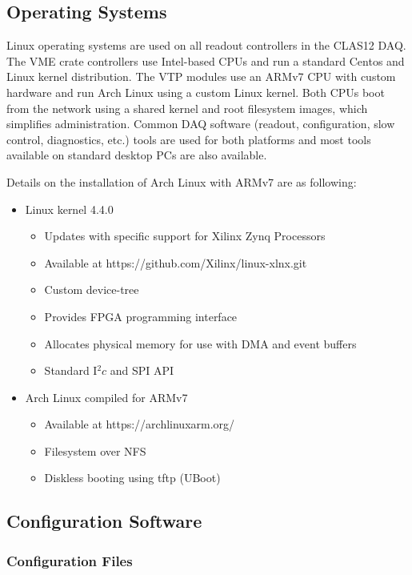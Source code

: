 \subsection{Operating Systems}

Linux operating systems are used on all readout controllers in the CLAS12 DAQ. The VME crate controllers use Intel-based CPUs and run a standard Centos and Linux kernel distribution. The VTP modules use an ARMv7 CPU with custom hardware and run Arch Linux using a custom Linux kernel. Both CPUs boot from the network using a shared kernel and root filesystem images, which simplifies administration. Common DAQ software (readout, configuration, slow control, diagnostics, etc.) tools are used for both platforms and most tools available on standard desktop PCs are also available.

Details on the installation of Arch Linux with ARMv7 are as following:

\begin{itemize}
\item Linux kernel 4.4.0
  \begin{itemize}
  \item Updates with specific support for Xilinx Zynq Processors
  \item Available at https://github.com/Xilinx/linux-xlnx.git
  \item Custom device-tree
  \item Provides FPGA programming interface
  \item Allocates physical memory for use with DMA and event buffers
  \item Standard I$^2c$ and SPI API
  \end{itemize}

\item Arch Linux compiled for ARMv7
  \begin{itemize}
  \item Available at https://archlinuxarm.org/
  \item Filesystem over NFS
  \item Diskless booting using tftp (UBoot)
  \end{itemize}
\end{itemize}


\subsection{Configuration Software}

\subsubsection{Configuration Files}

